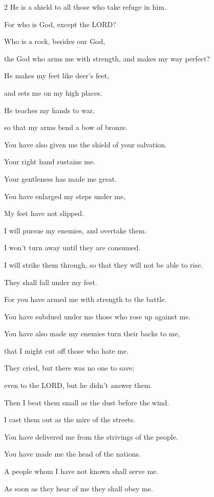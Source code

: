 \begin{multicols}{2}
	He is a shield to all those who take refuge in him.
	
	
	\myverse{}For who is God, except the LORD?
	
	Who is a rock, besides our God,
	
	
	\myverse{}the God who arms me with strength, and makes my way
	perfect?
	
	
	\myverse{}He makes my feet like deer’s feet,
	
	and sets me on my high places.
	
	
	\myverse{}He teaches my hands to war,
	
	so that my arms bend a bow of bronze.
	
	
	\myverse{}You have also given me the shield of your salvation.
	
	Your right hand sustains me.
	
	Your gentleness has made me great.
	
	
	\myverse{}You have enlarged my steps under me,
	
	My feet have not slipped.
	
	
	\myverse{}I will pursue my enemies, and overtake them.
	
	I won’t turn away until they are consumed.
	
	
	\myverse{}I will strike them through, so that they will not be able to
	rise.
	
	They shall fall under my feet.
	
	
	\myverse{}For you have armed me with strength to the battle.
	
	You have subdued under me those who rose up against me.
	
	
	\myverse{}You have also made my enemies turn their backs to me,
	
	that I might cut off those who hate me.
	
	
	\myverse{}They cried, but there was no one to save;
	
	even to the LORD, but he didn’t answer them.
	
	
	\myverse{}Then I beat them small as the dust before the wind.
	
	I cast them out as the mire of the streets.
	
	
	\myverse{}You have delivered me from the strivings of the people.
	
	You have made me the head of the nations.
	
	A people whom I have not known shall serve me.
	
	
	\myverse{}As soon as they hear of me they shall obey me.
	

\end{multicols}
